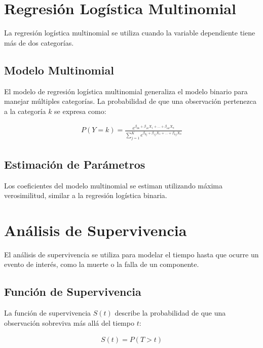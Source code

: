 \documentclass[a4paper]{report} %
\begin{document}
\section{Regresi\'on Log\'istica Multinomial}

La regresi\'on log\'istica multinomial se utiliza cuando la variable dependiente tiene m\'as de dos categor\'ias.

\subsection{Modelo Multinomial}

El modelo de regresi\'on log\'istica multinomial generaliza el modelo binario para manejar m\'ultiples categor\'ias. La probabilidad de que una observaci\'on pertenezca a la categor\'ia $k$ se expresa como:

\begin{eqnarray*}
P(Y = k) = \frac{e^{\beta_{0k} + \beta_{1k} X_1 + \ldots + \beta_{nk} X_n}}{\sum_{j=1}^{K} e^{\beta_{0j} + \beta_{1j} X_1 + \ldots + \beta_{nj} X_n}}
\end{eqnarray*}

\subsection{Estimaci\'on de Par\'ametros}

Los coeficientes del modelo multinomial se estiman utilizando m\'axima verosimilitud, similar a la regresi\'on log\'istica binaria.

\section{An\'alisis de Supervivencia}

El an\'alisis de supervivencia se utiliza para modelar el tiempo hasta que ocurre un evento de inter\'es, como la muerte o la falla de un componente.

\subsection{Funci\'on de Supervivencia}

La funci\'on de supervivencia $S(t)$ describe la probabilidad de que una observaci\'on sobreviva m\'as all\'a del tiempo $t$:

\begin{eqnarray*}
S(t) = P(T > t)
\end{eqnarray*}
\end{document}
